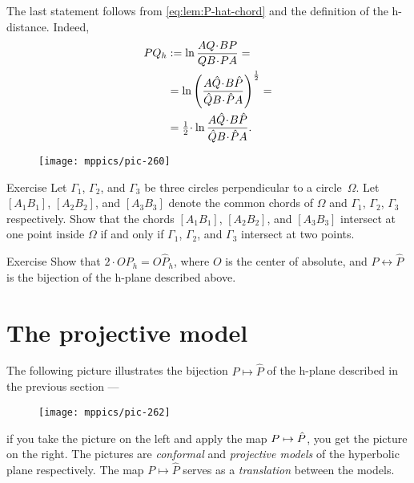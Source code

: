 The last statement follows from \ref{eq:lem:P-hat-chord} and the definition of the h-distance.
Indeed,
\begin{align*}
PQ_h&\df\ln\frac{A Q\cdot B P}{QB\cdot PA}=
\\
&=\ln\left(\frac{A \hat Q\cdot B \hat P}{\hat QB\cdot \hat PA}\right)^{\frac12}=
\\
&=\tfrac12\cdot\ln\frac{A \hat Q\cdot B \hat P}{\hat QB\cdot \hat PA}.
\end{align*}
\qedsf

{

\begin{wrapfigure}[8]{r}{36mm}
\centering
\vskip-8mm
\texttt{[image: mppics/pic-260]}
\end{wrapfigure}

\begin{thm}{Exercise}\label{ex:hex}
Let $\Gamma_1$, $\Gamma_2$, and $\Gamma_3$ 
be three circles perpendicular to a circle~$\Omega$.
Let $[A_1B_1]$, $[A_2B_2]$, and $[A_3B_3]$ denote
the common chords of $\Omega$ and $\Gamma_1$, $\Gamma_2$, $\Gamma_3$ respectively.
Show that the chords $[A_1B_1]$, $[A_2B_2]$, and $[A_3B_3]$ intersect at one point inside $\Omega$ if and only if $\Gamma_1$, $\Gamma_2$, and $\Gamma_3$ intersect at two points.
\end{thm}

\begin{thm}{Exercise}\label{ex:P<->hatP}
Show that $2\cdot OP_h=O\hat P_h$, where $O$ is the center of absolute, and $P\leftrightarrow \hat P$ is the bijection of the h-plane described above.
\end{thm}


}

\section{The projective model}
\label{sec:proj-model}

The following picture illustrates the bijection $P\mapsto \hat P$ of the h-plane described in the previous section --- 
\begin{figure}[!ht]
\centering
\texttt{[image: mppics/pic-262]}
\end{figure}
if you take the picture on the left and apply the map $P\mapsto \hat P$,
you get the picture on the right.
The pictures are {}\emph{conformal} and \emph{projective models} of the hyperbolic plane respectively.
The map $P\mapsto \hat P$ serves as a \textit{translation} between the models.

